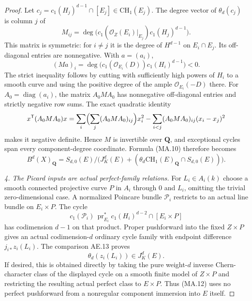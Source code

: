 \begin{proof}
Let $c_j=c_1(H_j)^{d-1}\cap[E_j]\in\mathrm{CH}_1(E_j)$.
The degree vector of $\theta_d(c_j)$ is column $j$ of
\[
 M_{ij}=\deg\bigl(c_1(\mathcal O_Z(E_i)|_{E_j})
                              c_1(H_j)^{d-1}\bigr).
\]
This matrix is symmetric: for $i\ne j$ it is the degree of
$H^{d-1}$ on $E_i\cap E_j$. Its off-diagonal entries are
nonnegative. With $a=(a_i)$,
\[
 (Ma)_i=\deg\bigl(c_1(\mathcal O_{E_i}(D))
                                      c_1(H_i)^{d-1}\bigr)<0.
\]
The strict inequality follows by cutting with sufficiently
high powers of $H_i$ to a smooth curve and using the positive
degree of the ample $\mathcal O_{E_i}(-D)$ there.
For $A_0=\operatorname{diag}(a_i)$, the matrix $A_0MA_0$ has
nonnegative off-diagonal entries and strictly negative row sums.
The exact quadratic identity
\[
 x^{\mathsf T}(A_0MA_0)x
 =\sum_i\Bigl(\sum_j(A_0MA_0)_{ij}\Bigr)x_i^2
     -\sum_{i<j}(A_0MA_0)_{ij}(x_i-x_j)^2
\]
makes it negative definite. Hence $M$ is invertible over
$\mathbf Q$, and exceptional cycles span every component-degree
coordinate. Formula (MA.10) therefore becomes
\begin{equation}
 B^d(X)_{\mathbf Q}
 =S_{d,0}(E)/
 \bigl(J_K^d(E)+
       (\theta_d\mathrm{CH}_1(E)_{\mathbf Q}\cap S_{d,0}(E))\bigr).
                                                        \tag{MA.11}
\end{equation}

\emph{4. The Picard inputs are actual perfect-family relations.}
For $L_i\in A_i(k)$ choose a smooth connected projective curve
$P$ in $A_i$ through $0$ and $L_i$, omitting the trivial
zero-dimensional case. A normalized Poincare bundle
$\mathcal P_i$ restricts to an actual line bundle on
$E_i\times P$. The cycle
\[
 c_1(\mathcal P_i)\,
          \operatorname{pr}_{E_i}^*c_1(H_i)^{d-2}
                          \cap[E_i\times P]
\]
has codimension $d-1$ on that product. Proper pushforward
into the fixed $Z\times P$ gives an actual codimension-$d$
ordinary cycle family with endpoint difference
$j_{i*}z_i(L_i)$. The comparison AE.13 proves
\begin{equation}
                    \theta_d(z_i(L_i))\in J_K^d(E).     \tag{MA.12}
\end{equation}
If desired, this is obtained directly by taking the pure
weight-$d$ inverse Chern-character class of the displayed
cycle on a smooth finite model of $Z\times P$ and restricting
the resulting actual perfect class to $E\times P$.
Thus (MA.12) uses no perfect pushforward from a nonregular
component immersion into $E$ itself.


\end{proof}
